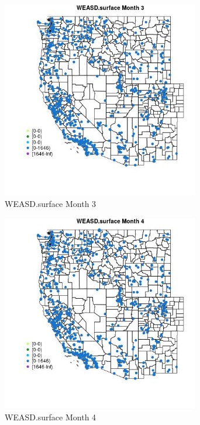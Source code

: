 \begin{figure} 
\centering  
\includegraphics[width=0.77\textwidth]{Code_Outputs/Report_ML_input_PM25_Step4_part_f_de_duplicated_aves_prioritize_24hr_obswNAs_MapObsMo3WEASDsurface.jpg} 
\caption{\label{fig:Report_ML_input_PM25_Step4_part_f_de_duplicated_aves_prioritize_24hr_obswNAsMapObsMo3WEASDsurface}WEASD.surface Month 3} 
\end{figure} 
 

\begin{figure} 
\centering  
\includegraphics[width=0.77\textwidth]{Code_Outputs/Report_ML_input_PM25_Step4_part_f_de_duplicated_aves_prioritize_24hr_obswNAs_MapObsMo4WEASDsurface.jpg} 
\caption{\label{fig:Report_ML_input_PM25_Step4_part_f_de_duplicated_aves_prioritize_24hr_obswNAsMapObsMo4WEASDsurface}WEASD.surface Month 4} 
\end{figure} 
 


